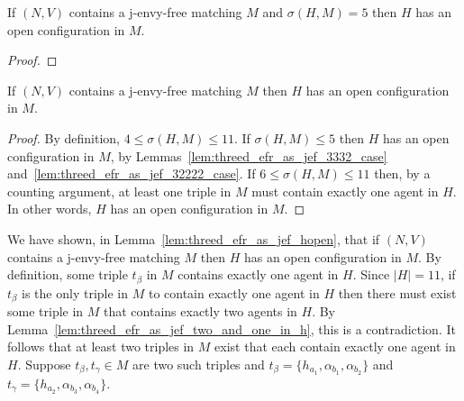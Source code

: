 \begin{lem}
\label{lem:threed_efr_as_jef_32222_case}
If $(N, V)$ contains a j-envy-free matching $M$ and $\sigma(H, M) = 5$ then $H$ has an open configuration in $M$.
\end{lem}
\begin{proof}

\end{proof}

\begin{lem}
\label{lem:threed_efr_as_jef_hopen}
If $(N, V)$ contains a j-envy-free matching $M$ then $H$ has an open configuration in $M$.
\end{lem}
\begin{proof}
By definition, $4 \leq \sigma(H, M) \leq 11$. If $\sigma(H, M) \leq 5$ then $H$ has an open configuration in $M$, by Lemmas~\ref{lem:threed_efr_as_jef_3332_case} and~\ref{lem:threed_efr_as_jef_32222_case}. If $6 \leq \sigma(H, M) \leq 11$ then, by a counting argument, at least one triple in $M$ must contain exactly one agent in $H$. In other words, $H$ has an open configuration in $M$.
\end{proof}

We have shown, in Lemma~\ref{lem:threed_efr_as_jef_hopen}, that if $(N, V)$ contains a j-envy-free matching $M$ then $H$ has an open configuration in $M$. By definition, some triple $t_{\beta}$ in $M$ contains exactly one agent in $H$. Since $|H|=11$, if $t_{\beta}$ is the only triple in $M$ to contain exactly one agent in $H$ then there must exist some triple in $M$ that contains exactly two agents in $H$. By Lemma~\ref{lem:threed_efr_as_jef_two_and_one_in_h}, this is a contradiction. It follows that at least two triples in $M$ exist that each contain exactly one agent in $H$. Suppose $t_{\beta}, t_{\gamma} \in M$ are two such triples and $t_{\beta} = \{ h_{a_1}, \alpha_{b_1}, \alpha_{b_2} \}$ and $t_{\gamma} = \{ h_{a_2}, \alpha_{b_3}, \alpha_{b_4} \}$.

